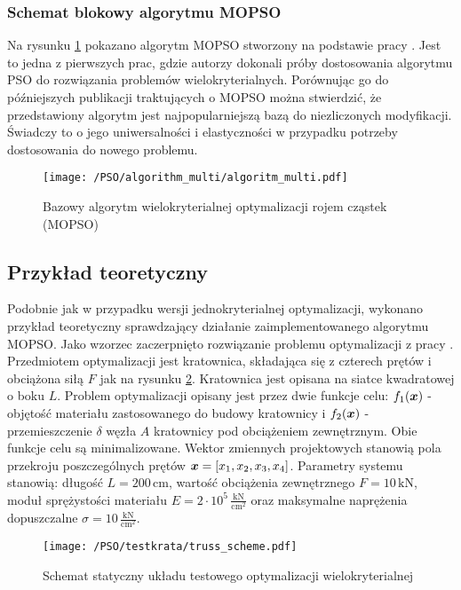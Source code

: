 \subsubsection{Schemat blokowy algorytmu MOPSO} \label{sect:MOPSO_algorithm}
Na rysunku \ref{fig: pso_multi_algorithm} pokazano algorytm MOPSO stworzony na podstawie pracy \parencite{CoelloCoello2002}. Jest to jedna z pierwszych prac, gdzie autorzy dokonali próby dostosowania algorytmu PSO do rozwiązania problemów wielokryterialnych. Porównując go do późniejszych publikacji traktujących o MOPSO można stwierdzić, że przedstawiony algorytm jest najpopularniejszą bazą do niezliczonych modyfikacji. Świadczy to o jego uniwersalności i elastyczności w przypadku potrzeby dostosowania do nowego problemu.

\begin{figure}[p]
	\centering
	\texttt{[image: /PSO/algorithm\_multi/algoritm\_multi.pdf]}
	\captionsetup{justification=centering}
	\caption{Bazowy algorytm wielokryterialnej optymalizacji rojem cząstek (MOPSO)}
	\label{fig: pso_multi_algorithm}
\end{figure}

\clearpage

\subsection{Przykład teoretyczny}
Podobnie jak w przypadku wersji jednokryterialnej optymalizacji, wykonano przykład teoretyczny sprawdzający działanie zaimplementowanego algorytmu MOPSO. Jako wzorzec zaczerpnięto rozwiązanie problemu optymalizacji z pracy \parencite{Zavala2014}. Przedmiotem optymalizacji jest kratownica, składająca się z czterech prętów i obciążona siłą $F$ jak na rysunku \ref{fig: pso_multi_testtruss}. Kratownica jest opisana na siatce kwadratowej o boku $L$. Problem optymalizacji opisany jest przez dwie funkcje celu: $f_1(\bm{x})$ - objętość materiału zastosowanego do budowy kratownicy i $f_2(\bm{x})$ - przemieszczenie $\delta$ węzła $A$ kratownicy pod obciążeniem zewnętrznym. Obie funkcje celu są minimalizowane. Wektor zmiennych projektowych stanowią pola przekroju poszczególnych prętów $\bm{x}=[x_1,x_2,x_3,x_4]$. Parametry systemu stanowią: długość $L=200\,\text{cm}$, wartość obciążenia zewnętrznego $F=10\,\text{kN}$, moduł sprężystości materiału $E=2\cdot10^5\,\frac{\text{kN}}{\text{cm}^2}$ oraz maksymalne naprężenia dopuszczalne $\sigma=10\,\frac{\text{kN}}{\text{cm}^2}$.
\begin{figure}[hbt!]
	\centering
	\texttt{[image: /PSO/testkrata/truss\_scheme.pdf]} 
	\captionsetup{justification=centering}
	\caption{Schemat statyczny układu testowego optymalizacji wielokryterialnej}
	\label{fig: pso_multi_testtruss} 
\end{figure}




